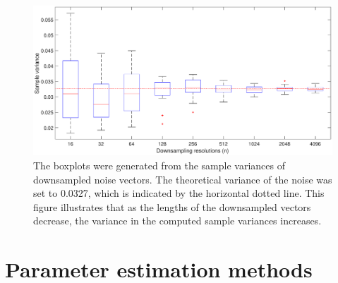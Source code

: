 \documentclass[12pt]{article}
\begin{document}
\begin{figure}
\centerline{\includegraphics[scale=0.45]{Figures/VarPlot1D_F1_S05_W100_R20.eps}}
\caption{The boxplots were generated from the sample variances of downsampled noise vectors. The theoretical variance of the noise was set to 0.0327, which is indicated by the horizontal dotted line. This figure illustrates that as the lengths of the downsampled vectors decrease, the variance in the computed sample variances increases.}
\label{VarPlot1D}
\end{figure}

\section{Parameter estimation methods} \label{Parameter estimation methods}
\end{document}

